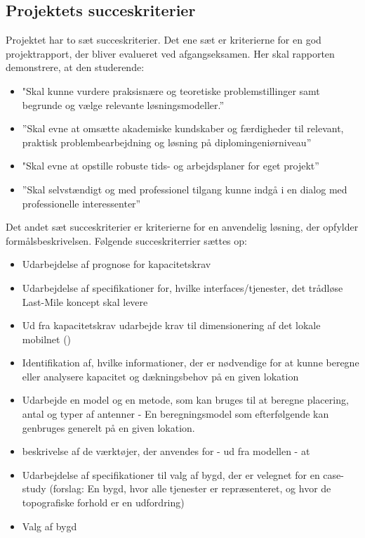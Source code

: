 \subsection{Projektets succeskriterier}\label{succes}
Projektet har to sæt succeskriterier. Det ene sæt er kriterierne for en god projektrapport, der bliver evalueret ved afgangseksamen. Her skal rapporten demonstrere, at den studerende:
\begin{itemize}
 \item "Skal kunne vurdere praksisnære og teoretiske problemstillinger samt begrunde og vælge relevante løsningsmodeller.”
 \item ”Skal evne at omsætte akademiske kundskaber og færdigheder til relevant, praktisk problembearbejdning og løsning på diplomingeniørniveau”
 \item "Skal evne at opstille robuste tids- og arbejdsplaner for eget projekt”
 \item ”Skal selvstændigt og med professionel tilgang kunne indgå i en dialog med professionelle interessenter”
\end{itemize}
\par

Det andet sæt succeskriterier er kriterierne for en anvendelig løsning, der opfylder formålsbeskrivelsen. Følgende succeskriterrier sættes op:
\begin{itemize}
	\item Udarbejdelse af prognose for kapacitetskrav
	\item Udarbejdelse af specifikationer for, hvilke interfaces/tjenester, det trådløse Last-Mile koncept skal levere
	\item Ud fra kapacitetskrav udarbejde krav til dimensionering af det lokale mobilnet ()
	\item Identifikation af, hvilke informationer, der er nødvendige for at kunne beregne eller analysere kapacitet og dækningsbehov på en given lokation
	\item Udarbejde en model og en metode, som kan bruges til at beregne placering, antal og typer af antenner - En beregningsmodel som efterfølgende kan genbruges generelt på en given lokation.
	\item beskrivelse af de værktøjer, der anvendes for - ud fra modellen - at 
	\item Udarbejdelse af specifikationer til valg af bygd, der er velegnet for en case-study (forslag: En bygd, hvor alle tjenester er repræsenteret, og hvor de topografiske forhold er en udfordring)
	\item Valg af bygd
\end{itemize}
